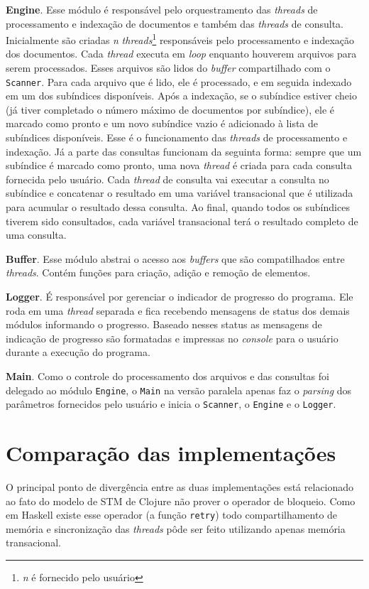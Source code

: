 \textbf{Engine}. Esse módulo é responsável pelo orquestramento das \emph{threads} de processamento e indexação de documentos e também das \emph{threads} de consulta. Inicialmente são criadas \emph{n} \emph{threads}\footnote{\emph{n} é fornecido pelo usuário} responsáveis pelo processamento e indexação dos documentos. Cada \emph{thread} executa em \emph{loop} enquanto houverem arquivos para serem processados. Esses arquivos são lidos do \emph{buffer} compartilhado com o \verb|Scanner|. Para cada arquivo que é lido, ele é processado, e em seguida indexado em um dos subíndices disponíveis. Após a indexação, se o subíndice estiver cheio (já tiver completado o número máximo de documentos por subíndice), ele é marcado como pronto e um novo subíndice vazio é adicionado à lista de subíndices disponíveis. Esse é o funcionamento das \emph{threads} de processamento e indexação. Já a parte das consultas funcionam da seguinta forma: sempre que um subíndice é marcado como pronto, uma nova \emph{thread} é criada para cada consulta fornecida pelo usuário. Cada \emph{thread} de consulta vai executar a consulta no subíndice e concatenar o resultado em uma variável transacional que é utilizada para acumular o resultado dessa consulta. Ao final, quando todos os subíndices tiverem sido consultados, cada variável transacional terá o resultado completo de uma consulta.

\textbf{Buffer}. Esse módulo abstrai o acesso aos \emph{buffers} que são compatilhados entre \emph{threads}. Contém funções para criação, adição e remoção de elementos.

\textbf{Logger}. É responsável por gerenciar o indicador de progresso do programa. Ele roda em uma \emph{thread} separada e fica recebendo mensagens de status dos demais módulos informando o progresso. Baseado nesses status as mensagens de indicação de progresso são formatadas e impressas no \emph{console} para o usuário durante a execução do programa.

\textbf{Main}. Como o controle do processamento dos arquivos e das consultas foi delegado ao módulo \verb|Engine|, o \verb|Main| na versão paralela apenas faz o \emph{parsing} dos parâmetros fornecidos pelo usuário e inicia o \verb|Scanner|, o \verb|Engine| e o \verb|Logger|.


\section{Comparação das implementações}

O principal ponto de divergência entre as duas implementações está relacionado ao fato do modelo de STM de Clojure não prover o operador de bloqueio. Como em Haskell existe esse operador (a função \verb|retry|) todo compartilhamento de memória e sincronização das \emph{threads} pôde ser feito utilizando apenas memória transacional.


